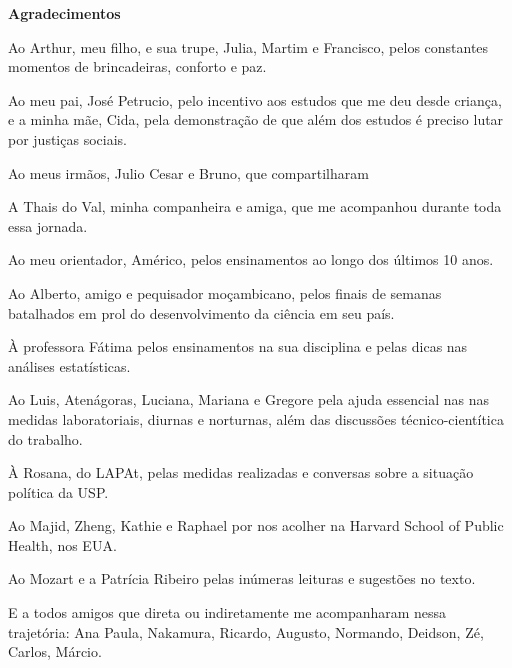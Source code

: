\newpage

\begin{center}
  \textbf{Agradecimentos} 
\end{center}

Ao Arthur, meu filho, e sua trupe, Julia, Martim e Francisco, pelos 
constantes momentos de brincadeiras, conforto e paz.

Ao meu pai, José Petrucio, pelo incentivo aos estudos que me deu desde criança,
e a minha mãe, Cida, pela demonstração de que além dos estudos é preciso lutar 
por justiças sociais. 

Ao meus irmãos, Julio Cesar e Bruno, que compartilharam 

A Thais do Val, minha companheira e amiga, que me acompanhou durante toda 
essa jornada.  

Ao meu orientador, Américo, pelos ensinamentos ao longo dos últimos 10 anos. 

Ao Alberto, amigo e pequisador moçambicano, pelos finais de semanas batalhados 
em prol do desenvolvimento da ciência em seu país. 

À professora Fátima pelos ensinamentos na sua disciplina e pelas dicas nas 
análises estatísticas. 

Ao Luis, Atenágoras, Luciana, Mariana e Gregore pela ajuda essencial nas 
nas medidas laboratoriais, diurnas e norturnas, além das discussões 
técnico-cientítica do trabalho. 

À Rosana, do LAPAt, pelas medidas realizadas e conversas sobre a situação 
política da USP.  

Ao Majid, Zheng, Kathie e Raphael por nos acolher na Harvard School of Public 
Health, nos EUA.

Ao Mozart e a Patrícia Ribeiro pelas inúmeras leituras e sugestões no texto. 

E a todos amigos que direta ou indiretamente me acompanharam nessa trajetória: 
Ana Paula, Nakamura, Ricardo, Augusto, Normando, Deidson, Zé, 
Carlos, Márcio. 




